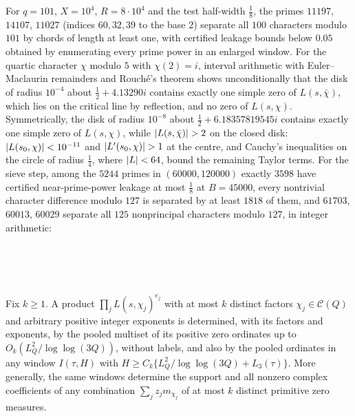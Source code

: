 \begin{example}\label{rec:ex:dict101}
For $q=101$, $X=10^4$, $R=8\cdot10^4$ and the test half-width $\tfrac18$, the primes $11197$, $14107$, $11027$
(indices $60,32,39$ to the base $2$) separate all $100$ characters modulo $101$ by chords of length at
least one, with certified leakage bounds below $0.05$ obtained by enumerating every prime power in an
enlarged window. For the quartic character $\chi$ modulo $5$ with $\chi(2)=i$, interval arithmetic with
Euler--Maclaurin remainders and Rouch\'e's theorem shows unconditionally that the disk of radius
$10^{-4}$ about $\tfrac12+4.13290i$ contains exactly one simple zero of $L(s,\bar\chi)$, which lies on the
critical line by reflection, and no zero of $L(s,\chi)$. Symmetrically, the disk of radius $10^{-8}$ about
$\tfrac12+6.18357819545i$ contains exactly one simple zero of $L(s,\chi)$, while $\lvert L(s,\bar\chi)\rvert>2$ on the
closed disk: $\lvert L(s_0,\chi)\rvert<10^{-11}$ and $\lvert L'(s_0,\chi)\rvert>1$ at the centre, and Cauchy's inequalities on
the circle of radius $\tfrac14$, where $\lvert L\rvert<64$, bound the remaining Taylor terms. For the sieve step,
among the $5244$ primes in $(60000,120000)$ exactly $3598$ have certified near-prime-power leakage at most
$\tfrac18$ at $B=45000$, every nontrivial character difference modulo $127$ is separated by at least $1818$ of
them, and $61703$, $60013$, $60029$ separate all $125$ nonprincipal characters modulo $127$, in integer
arithmetic:
\begin{center}
\\
\\
\\
\end{center}
\end{example}

\begin{corollary}\label{rec:cor:products}
Fix $k\ge1$. A product $\prod_jL(s,\chi_j)^{e_j}$ with at most $k$ distinct factors $\chi_j\in\mathcal C(Q)$ and
arbitrary positive integer exponents is determined, with its factors and exponents, by the pooled
multiset of its positive zero ordinates up to $O_k(L_Q^2/\log\log(3Q))$, without labels, and also by the
pooled ordinates in any window $I(\tau,H)$ with $H\ge C_k\{L_Q^2/\log\log(3Q)+L_3(\tau)\}$. More generally, the
same windows determine the support and all nonzero complex coefficients of any combination
$\sum_jz_jm_{\chi_j}$ of at most $k$ distinct primitive zero measures.
\end{corollary}

